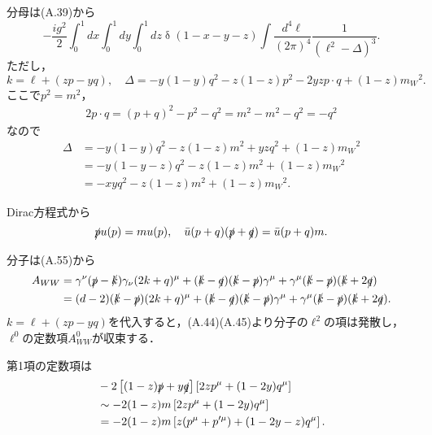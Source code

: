 分母は(A.39)から
\[ -\frac{ig^2}{2} \int_0^1 dx \int_0^1 dy \int_0^1 dz \mathop{\delta}(1-x-y-z) \int\frac{d^4\ell}{(2\pi)^4} \frac{1}{(\ell^2-\Delta)^3} . \]
ただし，
\[ k = \ell + (zp-yq) , \quad \Delta = - y(1-y)q^2 - z(1-z)p^2 - 2yz p\cdot q + (1-z) m_W{}^2 . \]
ここで\(p^2 = m^2\)，
\begin{align}
  2 p\cdot q = (p+q)^2 - p^2 - q^2 = m^2 - m^2 - q^2 = -q^2 \label{problem21_1_2pq}
\end{align}
なので
\begin{align*}
  \Delta &= - y(1-y)q^2 - z(1-z)m^2 + yz q^2 + (1-z) m_W{}^2 \\
  &= -y(1-y-z)q^2 - z(1-z) m^2 + (1-z) m_W{}^2 \\
  &= - xyq^2 - z(1-z) m^2 + (1-z) m_W{}^2.
\end{align*}

Dirac方程式から
\[\slashed{p} u(p) = m u(p) , \quad \bar{u}(p+q) (\slashed{p}+\slashed{q}) = \bar{u}(p+q) m .\]

分子は(A.55)から
\begin{align*}
  A_{WW} &= \gamma^\nu(\slashed{p}-\slashed{k})\gamma_\nu(2k+q)^\mu
  + (\slashed{k}-\slashed{q}) (\slashed{k}-\slashed{p}) \gamma^\mu
  + \gamma^\mu (\slashed{k}-\slashed{p}) (\slashed{k}+2\slashed{q}) \\
  &= (d-2)(\slashed{k}-\slashed{p}) (2k+q)^\mu
  + (\slashed{k}-\slashed{q}) (\slashed{k}-\slashed{p}) \gamma^\mu
  + \gamma^\mu (\slashed{k}-\slashed{p}) (\slashed{k}+2\slashed{q}) .
\end{align*}
\(k = \ell + (zp-yq)\)を代入すると，(A.44)(A.45)より分子の\(\ell^2\)の項は発散し，\(\ell^0\)の定数項\(A_{WW}^0\)が収束する．

第1項の定数項は
\begin{align*}
  & -2 \left[ (1-z) \slashed{p} + y \slashed{q} \right] \left[ 2zp^\mu + (1-2y) q^\mu \right] \\
  &\sim -2(1-z)m \left[ 2zp^\mu + (1-2y) q^\mu \right] \\
  &= -2(1-z)m \left[ z(p^\mu+p'^\mu) + (1-2y-z) q^\mu \right] .
\end{align*}

